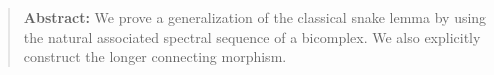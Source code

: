 \begin{center}
\begin{quote}
\textbf{Abstract:} 
We prove a generalization of the classical snake lemma by using the natural associated spectral sequence of a bicomplex. We also explicitly construct the longer connecting morphism.  
\end{quote}
\end{center}